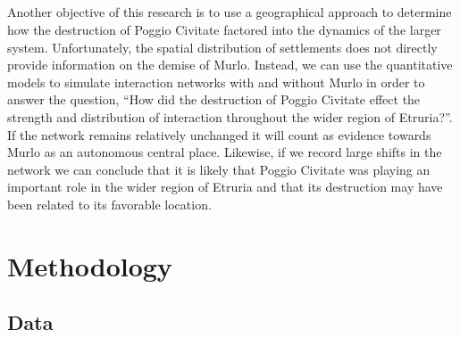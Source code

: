 \documentclass[12pt,a4paper]{thesis}
\begin{document}
\paragraph{}
Another objective of this research is to use a geographical approach to determine how the destruction of Poggio Civitate factored into the dynamics of the larger system. Unfortunately, the spatial distribution of settlements does not directly provide information on the demise of Murlo. Instead, we can use the quantitative models to simulate interaction networks with and without Murlo in order to answer the question, ``How did the destruction of Poggio Civitate effect the strength and distribution of interaction throughout the wider region of Etruria?''. If the network remains relatively unchanged it will count as evidence towards Murlo as an autonomous central place. Likewise, if we record large shifts in the network we can conclude that it is likely that Poggio Civitate was playing an important role in the wider region of Etruria and that its destruction may have been related to its favorable location. 

\chapter{Methodology}
\section{Data}
\end{document}
